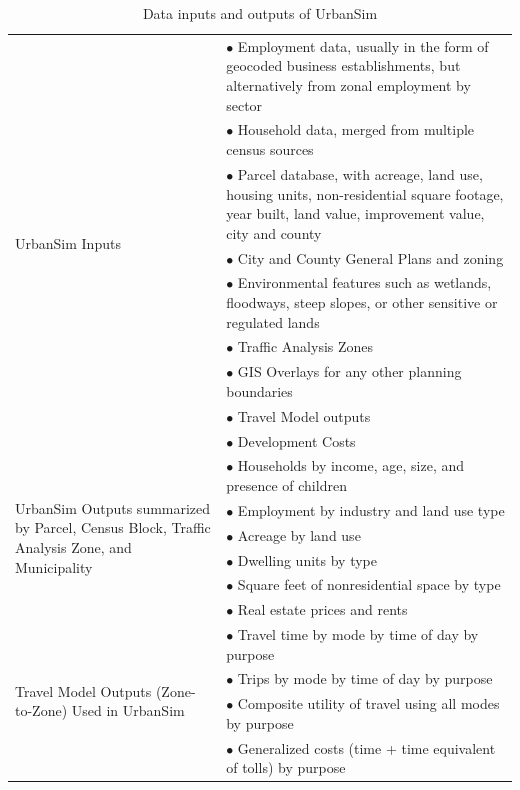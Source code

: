 \begin{table}[htbp]
\caption{Data inputs and outputs of UrbanSim}
\label{tab:inputs-outputs}
\begin{center}
\begin{tabular}{ p{1.8in} p{4.4in} }
\toprule[1.5pt]
\multirow{9}{1.8in}{UrbanSim Inputs}
& $\bullet$ Employment data, usually in the form of geocoded business establishments, but alternatively from zonal employment by sector\\
& $\bullet$ Household data, merged from multiple census sources\\
& $\bullet$ Parcel database, with acreage, land use, housing units, non-residential square footage, year built, land value, improvement value, city and county\\
& $\bullet$ City and County General Plans and zoning\\
& $\bullet$ Environmental features such as wetlands, floodways, steep slopes, or other sensitive or regulated lands\\
& $\bullet$ Traffic Analysis Zones\\
& $\bullet$ GIS Overlays for any other planning boundaries\\
& $\bullet$ Travel Model outputs\\
& $\bullet$ Development Costs \\
\midrule
\multirow{6}{1.8in}{UrbanSim Outputs summarized by Parcel, Census Block, Traffic Analysis Zone, and Municipality}
& $\bullet$ Households by income, age, size, and presence of children\\
& $\bullet$ Employment by industry and land use type\\
& $\bullet$ Acreage by land use\\
& $\bullet$ Dwelling units by type\\
& $\bullet$ Square feet of nonresidential space by type\\
& $\bullet$ Real estate prices and rents\\
\midrule
\multirow{4}{1.8in}{Travel Model Outputs (Zone-to-Zone) Used in UrbanSim}
& $\bullet$ Travel time by mode by time of day by purpose\\
& $\bullet$ Trips by mode by time of day by purpose\\
& $\bullet$ Composite utility of travel using all modes by purpose \\
& $\bullet$ Generalized costs (time + time equivalent of tolls) by purpose \\
\bottomrule
\end{tabular}
\end{center}
\end{table}

